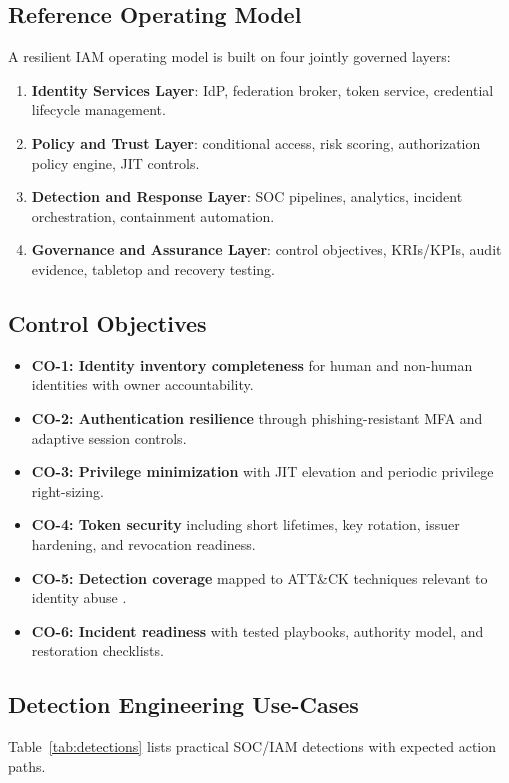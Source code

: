 \documentclass[11pt]{article}
\begin{document}
\subsection{Reference Operating Model}
A resilient IAM operating model is built on four jointly governed layers:
\begin{enumerate}[leftmargin=1.5em]
    \item \textbf{Identity Services Layer}: IdP, federation broker, token service, credential lifecycle management.
    \item \textbf{Policy and Trust Layer}: conditional access, risk scoring, authorization policy engine, JIT controls.
    \item \textbf{Detection and Response Layer}: SOC pipelines, analytics, incident orchestration, containment automation.
    \item \textbf{Governance and Assurance Layer}: control objectives, KRIs/KPIs, audit evidence, tabletop and recovery testing.
\end{enumerate}

\subsection{Control Objectives}
\begin{itemize}[leftmargin=1.5em]
    \item \textbf{CO-1: Identity inventory completeness} for human and non-human identities with owner accountability.
    \item \textbf{CO-2: Authentication resilience} through phishing-resistant MFA and adaptive session controls.
    \item \textbf{CO-3: Privilege minimization} with JIT elevation and periodic privilege right-sizing.
    \item \textbf{CO-4: Token security} including short lifetimes, key rotation, issuer hardening, and revocation readiness.
    \item \textbf{CO-5: Detection coverage} mapped to ATT\&CK techniques relevant to identity abuse \cite{mitre_attck}.
    \item \textbf{CO-6: Incident readiness} with tested playbooks, authority model, and restoration checklists.
\end{itemize}

\subsection{Detection Engineering Use-Cases}
Table~\ref{tab:detections} lists practical SOC/IAM detections with expected action paths.
\end{document}
